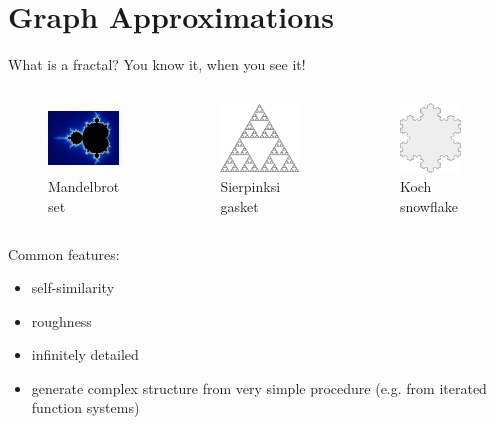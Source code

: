 \section{Graph Approximations}
\begin{frame}{What is a fractal?}
    You know it, when you see it!

    \begin{columns}[c]
        \begin{figure}
            \centering
            \includegraphics[height=5em]{images/mandelbrot.pdf}
            \caption{Mandelbrot set}
        \end{figure}
        \begin{figure}
            \centering
            \includegraphics[height=5em]{images/sierpinksi.pdf}
            \caption{Sierpinksi gasket}
        \end{figure}
        \begin{figure}
            \centering
            \includegraphics[height=5em]{images/snowflake.pdf}
            \caption{Koch snowflake}
        \end{figure}
    \end{columns}

    Common features: 
    \begin{itemize}
        \item self-similarity
        \item roughness
        \item infinitely detailed
        \item generate complex structure from very simple procedure (e.g. from iterated function systems)
    \end{itemize}
\end{frame}

